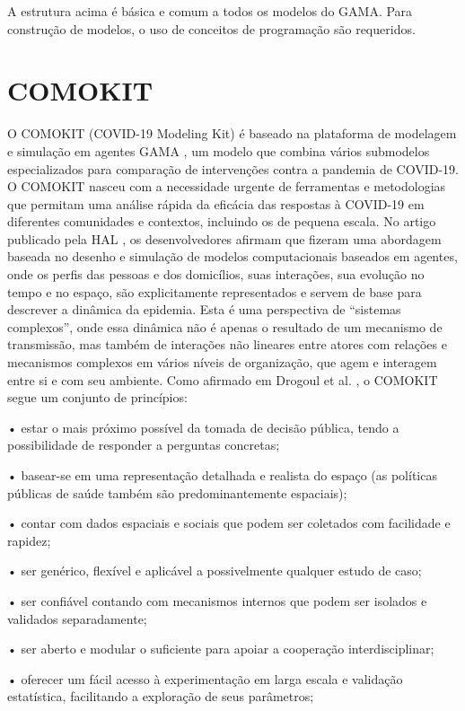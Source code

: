 A estrutura acima é básica e comum a todos os modelos do GAMA. Para construção de modelos, o uso de conceitos de programação são requeridos.

\section{COMOKIT}

O COMOKIT (COVID-19 Modeling Kit) é baseado na plataforma de modelagem e simulação em agentes GAMA \cite{gaudou2020comokit}, um modelo que combina vários submodelos especializados para comparação de intervenções contra a pandemia de COVID-19. O COMOKIT nasceu com a necessidade urgente de ferramentas e metodologias que permitam uma análise rápida da eficácia das respostas à COVID-19 em diferentes comunidades e contextos, incluindo os de pequena escala. No artigo publicado pela HAL \cite{gaudou2020comokit}, os desenvolvedores afirmam que fizeram uma abordagem baseada no desenho e simulação de modelos computacionais baseados em agentes, onde os perfis das pessoas e dos domicílios, suas interações, sua evolução no tempo e no espaço, são explicitamente representados e servem de base para descrever a dinâmica da epidemia. Esta é uma perspectiva de “sistemas complexos”, onde essa dinâmica não é apenas o resultado de um mecanismo de transmissão, mas também de interações não lineares entre atores com relações e mecanismos complexos em vários níveis de organização, que agem e interagem entre si e com seu ambiente.
Como afirmado em Drogoul et al. \cite{gaudou2020comokit}, o COMOKIT segue um conjunto de princípios:

• estar o mais próximo possível da tomada de decisão pública, tendo a possibilidade de responder a perguntas concretas;

• basear-se em uma representação detalhada e realista do espaço (as políticas públicas de saúde também são predominantemente espaciais);

• contar com dados espaciais e sociais que podem ser coletados com facilidade e rapidez;

• ser genérico, flexível e aplicável a possivelmente qualquer estudo de caso;

• ser confiável contando com mecanismos internos que podem ser isolados e validados separadamente;

• ser aberto e modular o suficiente para apoiar a cooperação interdisciplinar;

• oferecer um fácil acesso à experimentação em larga escala e validação estatística, facilitando a exploração de seus parâmetros;

